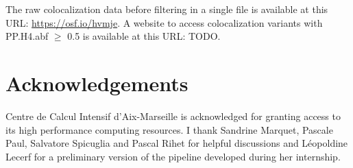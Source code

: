 The raw colocalization data before filtering in a single file is available at this URL: \url{https://osf.io/hvmje}.
%
A website to access colocalization variants with PP.H4.abf $\geq$ 0.5 is available at this URL: TODO.

\section*{Acknowledgements}

Centre de Calcul Intensif d'Aix-Marseille is acknowledged for granting access to its high performance computing resources.
%
I thank Sandrine Marquet, Pascale Paul, Salvatore Spicuglia and Pascal Rihet for helpful discussions and L\'eopoldine Lecerf for a preliminary version of the pipeline developed during her internship.

